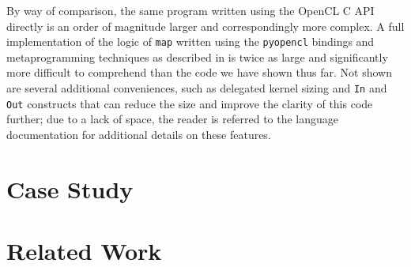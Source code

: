 \documentclass{sig-alternate}
\begin{document}
By way of comparison, the same program written using the OpenCL C API directly is an order of magnitude larger and correspondingly more complex. A full implementation of the logic of \verb|map| written using the \verb|pyopencl| bindings and metaprogramming techniques as described in \cite{pyopencl} is twice as large and significantly more difficult to comprehend than the code we have shown thus far. Not shown are several additional conveniences, such as delegated kernel sizing and \verb|In| and \verb|Out| constructs that can reduce the size and improve the clarity of this code further; due to a lack of space, the reader is referred to the language documentation for additional details on these features.



\section{Case Study}\label{casestudy}
\section{Related Work}\label{related}
\end{document}
